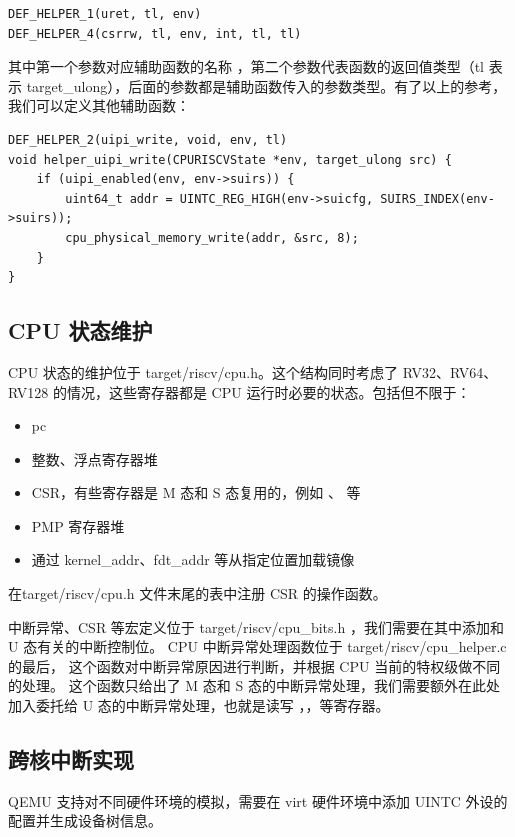 \begin{lstlisting}[style=CStyle]
DEF_HELPER_1(uret, tl, env)
DEF_HELPER_4(csrrw, tl, env, int, tl, tl)
\end{lstlisting}

其中第一个参数对应辅助函数的名称 ，第二个参数代表函数的返回值类型（tl 表示 target\_ulong），后面的参数都是辅助函数传入的参数类型。有了以上的参考，我们可以定义其他辅助函数：

\begin{lstlisting}[style=CStyle]
DEF_HELPER_2(uipi_write, void, env, tl)
void helper_uipi_write(CPURISCVState *env, target_ulong src) {
    if (uipi_enabled(env, env->suirs)) {
        uint64_t addr = UINTC_REG_HIGH(env->suicfg, SUIRS_INDEX(env->suirs));
        cpu_physical_memory_write(addr, &src, 8);
    }
}
\end{lstlisting}

\subsection{CPU 状态维护}

CPU 状态的维护位于 target/riscv/cpu.h。这个结构同时考虑了 RV32、RV64、RV128 的情况，这些寄存器都是 CPU 运行时必要的状态。包括但不限于：

\begin{itemize}
    \item pc
    \item 整数、浮点寄存器堆
    \item CSR，有些寄存器是 M 态和 S 态复用的，例如 \Rmstatus、 \Rmip 等
    \item PMP 寄存器堆
    \item 通过 kernel\_addr、fdt\_addr 等从指定位置加载镜像
\end{itemize}

在target/riscv/cpu.h 文件末尾的表中注册 CSR 的操作函数。

中断异常、CSR 等宏定义位于 target/riscv/cpu\_bits.h ，我们需要在其中添加和 U 态有关的中断控制位。
CPU 中断异常处理函数位于 target/riscv/cpu\_helper.c 的最后，
这个函数对中断异常原因进行判断，并根据 CPU 当前的特权级做不同的处理。
这个函数只给出了 M 态和 S 态的中断异常处理，我们需要额外在此处加入委托给 U 态的中断异常处理，也就是读写 \Rustatus，\Rucause，\Ruepc 等寄存器。

\subsection{跨核中断实现}

QEMU 支持对不同硬件环境的模拟，需要在 virt 硬件环境中添加 UINTC 外设的配置并生成设备树信息。

